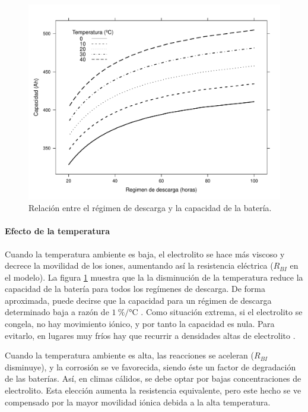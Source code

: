 %
\begin{figure}
\includegraphics[scale=0.75]{../figs/Bateria_Capacidad}

\caption{Relación entre el régimen de descarga y la capacidad de la batería.\label{fig:RegimenDescargaCapacidad}}



\end{figure}



\paragraph{Efecto de la temperatura}

Cuando la temperatura ambiente es baja, el electrolito se hace más
viscoso y decrece la movilidad de los iones, aumentando así la resistencia
eléctrica ($R_{BI}$ en el modelo). La figura \ref{fig:RegimenDescargaCapacidad}
muestra que la la disminución de la temperatura reduce la capacidad
de la batería para todos los regímenes de descarga. De forma aproximada,
puede decirse que la capacidad para un régimen de descarga determinado
baja a razón de $\SI{1}{\percent\per\celsius}$ \cite{Lorenzo1994}.
Como situación extrema, si el electrolito se congela, no hay movimiento
iónico, y por tanto la capacidad es nula. Para evitarlo, en lugares
muy fríos hay que recurrir a densidades altas de electrolito .

Cuando la temperatura ambiente es alta, las reacciones se aceleran
($R_{BI}$ disminuye), y la corrosión se ve favorecida, siendo éste
un factor de degradación de las baterías. Así, en climas cálidos,
se debe optar por bajas concentraciones de electrolito. Esta elección
aumenta la resistencia equivalente, pero este hecho se ve compensado
por la mayor movilidad iónica debida a la alta temperatura.

